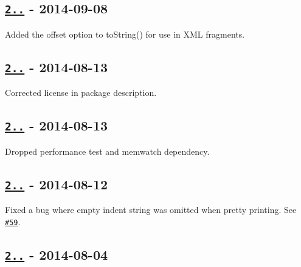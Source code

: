 \subsection*{\href{https://github.com/oozcitak/xmlbuilder-js/compare/v2.4.3...v2.4.4}{\tt 2..} -\/ 2014-\/09-\/08}


\begin{DoxyItemize}
\item Added the {\ttfamily offset} option to {\ttfamily to\+String()} for use in X\+ML fragments.
\end{DoxyItemize}

\subsection*{\href{https://github.com/oozcitak/xmlbuilder-js/compare/v2.4.2...v2.4.3}{\tt 2..} -\/ 2014-\/08-\/13}


\begin{DoxyItemize}
\item Corrected license in package description.
\end{DoxyItemize}

\subsection*{\href{https://github.com/oozcitak/xmlbuilder-js/compare/v2.4.1...v2.4.2}{\tt 2..} -\/ 2014-\/08-\/13}


\begin{DoxyItemize}
\item Dropped performance test and memwatch dependency.
\end{DoxyItemize}

\subsection*{\href{https://github.com/oozcitak/xmlbuilder-js/compare/v2.4.0...v2.4.1}{\tt 2..} -\/ 2014-\/08-\/12}


\begin{DoxyItemize}
\item Fixed a bug where empty indent string was omitted when pretty printing. See \href{https://github.com/oozcitak/xmlbuilder-js/issues/59}{\tt \#59}.
\end{DoxyItemize}

\subsection*{\href{https://github.com/oozcitak/xmlbuilder-js/compare/v2.3.0...v2.4.0}{\tt 2..} -\/ 2014-\/08-\/04}


